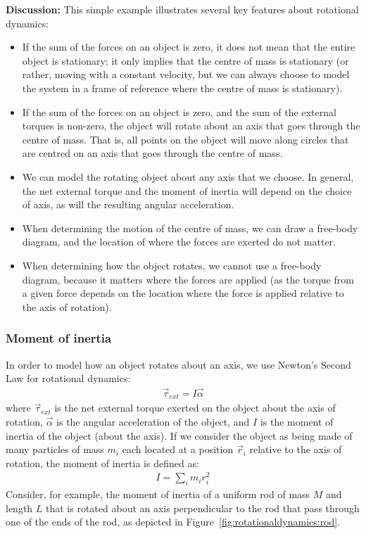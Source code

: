\begin{framed}
\begin{framed}
\textbf{Discussion:} This simple example illustrates several key features about rotational dynamics:

\begin{itemize}
\item If the sum of the forces on an object is zero, it does not mean that the entire object is stationary; it only implies that the centre of mass is stationary (or rather, moving with a constant velocity, but we can always choose to model the system in a frame of reference where the centre of mass is stationary).
\item If the sum of the forces on an object is zero, and the sum of the external torques is non-zero, the object will rotate about an axis that goes through the centre of mass. That is, all points on the object will move along circles that are centred on an axis that goes through the centre of mass.
\item We can model the rotating object about any axis that we choose. In general, the net external torque and the moment of inertia will depend on the choice of axis, as will the resulting angular acceleration.
\item When determining the motion of the centre of mass, we can draw a free-body diagram, and the location of where the forces are exerted do not matter.
\item When determining how the object rotates, we cannot use a free-body diagram, because it matters where the forces are applied (as the torque from a given force depends on the location where the force is applied relative to the axis of rotation).
\end{itemize}
\end{framed}
\end{framed}

\subsubsection{Moment of inertia}

In order to model how an object rotates about an axis, we use Newton's Second Law for rotational dynamics:
\begin{align*}
\vec\tau_{ext} = I \vec \alpha
\end{align*}
where $\vec\tau_{ext}$ is the net external torque exerted on the object about the axis of rotation, $\vec \alpha$ is the angular acceleration of the object, and $I$ is the moment of inertia of the object (about the axis). If we consider the object as being made of many particles of mass $m_i$ each located at a position $\vec r_i$ relative to the axis of rotation, the moment of inertia is defined as:
\begin{align*}
I = \sum_i m_i r_i^2
\end{align*}
Consider, for example, the moment of inertia of a uniform rod of mass $M$ and length $L$ that is rotated about an axis perpendicular to the rod that pass through one of the ends of the rod, as depicted in Figure~\ref{fig:rotationaldynamics:rod}.

